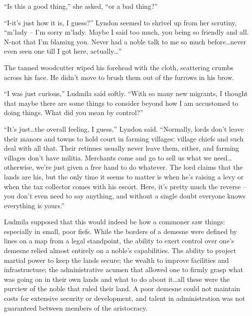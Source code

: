  

“Is this a good thing,” she asked, “or a bad thing?”

 

“I-it’s just how it is, I guess?” Lyndon seemed to shrivel up from her scrutiny, “m’lady – I’m sorry m’lady. Maybe I said too much, you being so friendly and all. N-not that I’m blaming you. Never had a noble talk to me so much before…never even seen one till I got here, actually…”

 

The tanned woodcutter wiped his forehead with the cloth, scattering crumbs across his face. He didn’t move to brush them out of the furrows in his brow.

 

“I was just curious,” Ludmila said softly. “With so many new migrants, I thought that maybe there are some things to consider beyond how I am accustomed to doing things. What did you mean by control?”

 

“It’s just…the overall feeling, I guess,” Lyndon said. “Normally, lords don’t leave their manors and towns to hold court in farming villages: village chiefs and such deal with all that. Their retinues usually never leave them, either, and farming villages don’t have militia. Merchants come and go to sell us what we need…otherwise, we’re just given a free hand to do whatever. The lord claims that the lands are his, but the only time it seems to matter is when he’s raising a levy or when the tax collector comes with his escort. Here, it’s pretty much the reverse – you don’t even need to say anything, and without a single doubt everyone knows everything is yours.”

 

Ludmila supposed that this would indeed be how a commoner saw things: especially in small, poor fiefs. While the borders of a demesne were defined by lines on a map from a legal standpoint, the ability to exert control over one’s demesne relied almost entirely on a noble’s capabilities. The ability to project martial power to keep the lands secure; the wealth to improve facilities and infrastructure; the administrative acumen that allowed one to firmly grasp what was going on in their own lands and what to do about it…all these were the purview of the noble that ruled their land. A poor demesne could not maintain costs for extensive security or development, and talent in administration was not guaranteed between members of the aristocracy.

